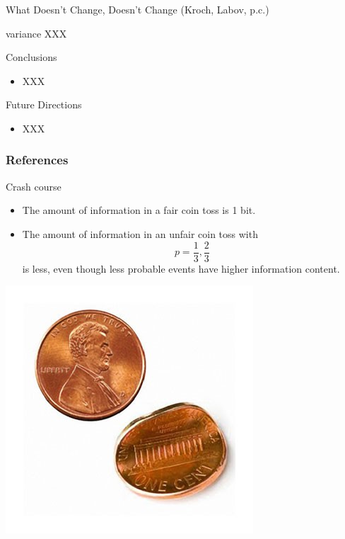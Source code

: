\documentclass[hyperref={pdfpagelabels=false}]{beamer}
\begin{document}
\begin{frame}{What Doesn't Change, Doesn't Change (Kroch, Labov, p.c.)} 
	
	
	\begin{center}
		variance XXX
	\end{center}
	
\end{frame}

\begin{frame}{Conclusions} 
	
	
	\begin{itemize}
		\item XXX
	\end{itemize}
	
\end{frame}


\begin{frame}{Future Directions} 
	
	
	\begin{itemize}
		\item XXX
	\end{itemize}
	
\end{frame}




\begin{frame}[allowframebreaks]
\frametitle{References}


\end{frame}


\begin{frame}{Crash course} 
	\begin{itemize}
		\item The amount of information in a fair coin toss is 1 bit.
		\item The amount of information in an unfair coin toss with $$p = \frac{1}{3}, \frac{2}{3}$$ is less, even though less probable events have higher information content.
	\end{itemize}
	\begin{center}
		\includegraphics[scale=0.4]{bentcoin.jpg}
	\end{center}
\end{frame}
\end{document}
